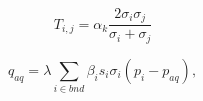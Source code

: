 \documentclass[14pt]{article}
\begin{document}
	
	\begin{equation} \label{Tij}
		T_{i,j} =\alpha_k \frac{2{\sigma_i}{\sigma_j}}{{\sigma_i} + {\sigma_j}}
	\end{equation}
	
	
	\begin{equation} \label{aq_num}
	q_{aq} =  
		\lambda\sum_{i \in bnd} \beta_i s_i\sigma_i(p_i-p_{aq}),
	\end{equation}
\end{document}
